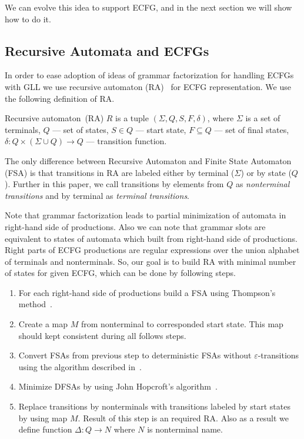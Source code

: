 \documentclass[runningheads,a4paper]{llncs}
\begin{document}
We can evolve this idea to support ECFG, and in the next section we will show how to do it.

\subsection{Recursive Automata and ECFGs}

In order to ease adoption of ideas of grammar factorization for handling ECFGs with GLL we use recursive automaton (RA)~\cite{tellier2006learning} for ECFG representation.
We use the following definition of RA.

\begin{mydef}
    Recursive automaton~(RA) $R$ is a tuple $(\Sigma, Q, S, F, \delta)$, where
    $\Sigma$ is a set of terminals,
    $Q$ --- set of states,
    $S \in Q$ --- start state,
    $F \subseteq Q$ --- set of final states,
    $\delta : Q \times (\Sigma \cup Q) \to Q$ --- transition function.
\end{mydef}

The only difference between Recursive Automaton and Finite State Automaton (FSA) is that transitions in RA are labeled either by terminal ($\Sigma$) or by state ($Q$).
Further in this paper, we call transitions by elements from $Q$ as \textit{nonterminal transitions} and by terminal as \textit{terminal transitions}.

Note that grammar factorization leads to partial minimization of automata in right-hand side of productions.
Also we can note that grammar slots are equivalent to states of automata which built from right-hand side of productions.
Right parts of ECFG productions are regular expressions over the union alphabet of terminals and nonterminals.
So, our goal is to build RA with minimal number of states for given ECFG, which can be done by following steps.
\begin{enumerate} 
\item For each right-hand side of productions build a FSA using Thompson's method~\cite{Thompson:1968:PTR:363347.363387}.
\item Create a map $M$ from nonterminal to corresponded start state.
This map should kept consistent during all follows steps. 
\item Convert FSAs from previous step to deterministic FSAs without $\varepsilon$-transitions using the algorithm described in~\cite{aho1974design}.
\item Minimize DFSAs by using John Hopcroft's algorithm~\cite{hopcroft1971n}.
\item Replace transitions by nonterminals with transitions labeled by start states by using map $M$.
Result of this step is an required RA. Also as a result we define function $\Delta : Q \to N$ where $N$ is nonterminal name.
\end{enumerate}
\end{document}
